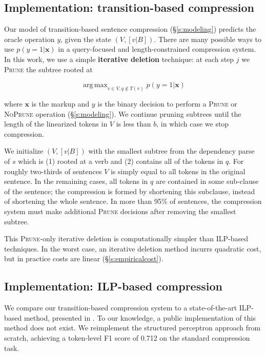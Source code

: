 \documentclass[11pt,a4paper]{article}
\DeclareMathOperator*{\argmaxA}{arg\,max} %
\begin{document}
\subsection{Implementation: transition-based compression}\label{s:transition}

Our model of transition-based sentence compression (\S\ref{s:modeling}) predicts the oracle operation $y$, given the state $(V,[v|B])$. There are many possible ways to use $p(y=1| \bm{x})$ in a query-focused and length-constrained compression system. In this work, we use a simple \textbf{iterative deletion} technique: at each step $j$ we \textsc{Prune} the subtree rooted at 

$$\argmaxA_{v \in V,q\not\in T(v)}   p(y = 1 | \bm{x})$$

\noindent where $\bm{x}$ is the markup and $y$ is the binary decision to perform a \textsc{Prune} or \textsc{NoPrune} operation (\S\ref{s:modeling}). We continue pruning subtrees until the length of the linearized tokens in $V$ is less than $b$, in which case we stop compression. 

We initialize $(V, [v|B])$ with the smallest subtree from the dependency parse of $s$ which is (1) rooted at a verb and (2) contains all of the tokens in $q$. For roughly two-thirds of sentences $V$ is simply equal to all tokens in the original sentence. In the remaining cases, all tokens in $q$ are contained in some sub-clause of the sentence; the compression is formed by shortening this subclause, instead of shortening the whole sentence. In more than 95\% of sentences, the compression system must make additional \textsc{Prune} decisions after removing the smallest subtree.

This \textsc{Prune}-only iterative deletion is computationally simpler than ILP-based techniques. In the worst case, an iterative deletion method incurrs quadratic cost, but in practice costs are linear (\S\ref{s:empiricalcost}).

\subsection{Implementation: ILP-based compression}\label{s:ilp}

We compare our transition-based compression system to a state-of-the-art ILP-based method, presented in \citet{filippova2013overcoming}. To our knowledge, a public implementation of this method does not exist. We reimplement the structured perceptron approach from scratch, achieving a token-level F1 score of  0.712 on the standard compression task. 
\end{document}
